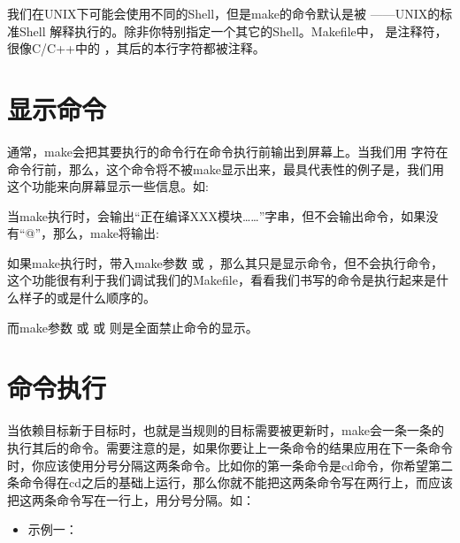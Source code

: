 \documentclass[a4paper,10pt]{sphinxmanual}
\begin{document}
我们在UNIX下可能会使用不同的Shell，但是make的命令默认是被  ——UNIX的标准Shell
解释执行的。除非你特别指定一个其它的Shell。Makefile中， \sphinxcode{\sphinxupquote{\#}} 是注释符，很像C/C++中的
\sphinxcode{\sphinxupquote{//}} ，其后的本行字符都被注释。


\section{显示命令}
\label{\detokenize{recipes:id2}}
通常，make会把其要执行的命令行在命令执行前输出到屏幕上。当我们用  字符在命令行前，那么，这个命令将不被make显示出来，最具代表性的例子是，我们用这个功能来向屏幕显示一些信息。如:

\begin{sphinxVerbatim}[commandchars=\\\{\}]
 
\end{sphinxVerbatim}

当make执行时，会输出“正在编译XXX模块……”字串，但不会输出命令，如果没有“@”，那么，make将输出:

\begin{sphinxVerbatim}[commandchars=\\\{\}]
 
\end{sphinxVerbatim}

如果make执行时，带入make参数  或  ，那么其只是显示命令，但不会执行命令，这个功能很有利于我们调试我们的Makefile，看看我们书写的命令是执行起来是什么样子的或是什么顺序的。

而make参数  或  或  则是全面禁止命令的显示。


\section{命令执行}
\label{\detokenize{recipes:id3}}
当依赖目标新于目标时，也就是当规则的目标需要被更新时，make会一条一条的执行其后的命令。需要注意的是，如果你要让上一条命令的结果应用在下一条命令时，你应该使用分号分隔这两条命令。比如你的第一条命令是cd命令，你希望第二条命令得在cd之后的基础上运行，那么你就不能把这两条命令写在两行上，而应该把这两条命令写在一行上，用分号分隔。如：
\begin{itemize}
\item {} 
示例一：

\end{itemize}
\end{document}
